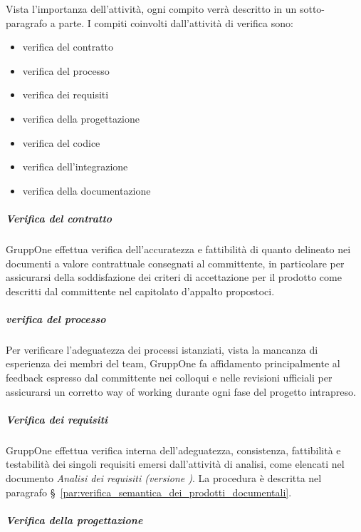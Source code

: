 \documentclass[../../norme-di-progetto.tex]{subfiles}
\begin{document}
Vista l'importanza dell'attività, ogni compito verrà descritto in un sotto-paragrafo a parte. I compiti coinvolti dall'attività di verifica sono:

\begin{itemize}
  \item verifica del contratto
  \item verifica del processo
  \item verifica dei requisiti
  \item verifica della progettazione
  \item verifica del codice
  \item verifica dell'integrazione
  \item verifica della documentazione
\end{itemize}

\subparagraph{Verifica del contratto}%
\label{subp:verifica_del_contratto}

GruppOne effettua verifica dell'accuratezza e fattibilità di quanto delineato nei documenti a valore contrattuale consegnati al committente, in particolare per assicurarsi della soddisfazione dei criteri di accettazione per il prodotto come descritti dal committente nel capitolato d'appalto propostoci.


\subparagraph{verifica del processo}%
\label{subp:verifica_del_processo}

Per verificare l'adeguatezza dei processi istanziati, vista la mancanza di esperienza dei membri del team, GruppOne fa affidamento principalmente al feedback espresso dal committente nei colloqui e nelle revisioni ufficiali per assicurarsi un corretto way of working durante ogni fase del progetto intrapreso.


\subparagraph{Verifica dei requisiti}%
\label{subp:verifica_dei_requisiti}

GruppOne effettua verifica interna dell'adeguatezza, consistenza, fattibilità e testabilità dei singoli requisiti emersi dall'attività di analisi, come elencati nel documento \textit{Analisi dei requisiti (versione \versione)}.
La procedura è descritta nel paragrafo §~\ref{par:verifica_semantica_dei_prodotti_documentali}.


\subparagraph{Verifica della progettazione}%
\label{subp:verifica_della_progettazione}
\end{document}
